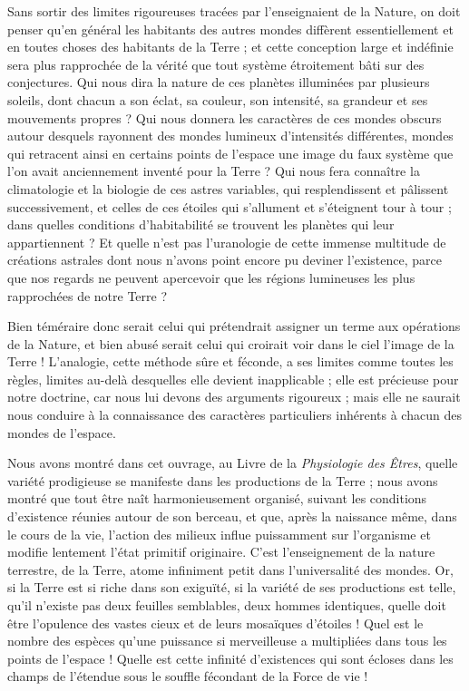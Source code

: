 \documentclass[a4paper, 11pt, oneside]{article}
\begin{document}
Sans sortir des limites rigoureuses tracées par l'enseignaient de la Nature, on doit penser qu'en général les habitants des autres mondes diffèrent essentiellement et en toutes choses des habitants de la Terre ; et cette conception large et indéfinie sera plus rapprochée de la vérité que tout système étroitement bâti sur des conjectures. Qui nous dira la nature de ces planètes illuminées par plusieurs soleils, dont chacun a son éclat, sa couleur, son intensité, sa grandeur et ses mouvements propres ? Qui nous donnera les caractères de ces mondes obscurs autour desquels rayonnent des mondes lumineux d'intensités différentes, mondes qui retracent ainsi en certains points de l'espace une image du faux système que l'on avait anciennement inventé pour la Terre ? Qui nous fera connaître la climatologie et la biologie de ces astres variables, qui resplendissent et pâlissent successivement, et celles de ces étoiles qui s'allument et s'éteignent tour à tour ; dans quelles conditions d'habitabilité se trouvent les planètes qui leur appartiennent ? Et quelle n'est pas l'uranologie de cette immense multitude de créations astrales dont nous n'avons point encore pu deviner l'existence, parce que nos regards ne peuvent apercevoir que les régions lumineuses les plus rapprochées de notre Terre ?

Bien téméraire donc serait celui qui prétendrait assigner un terme aux opérations de la Nature, et bien abusé serait celui qui croirait voir dans le ciel l'image de la Terre ! L'analogie, cette méthode sûre et féconde, a ses limites comme toutes les règles, limites au-delà desquelles elle devient inapplicable ; elle est précieuse pour notre doctrine, car nous lui devons des arguments rigoureux ; mais elle ne saurait nous conduire à la connaissance des caractères particuliers inhérents à chacun des mondes de l'espace.

Nous avons montré dans cet ouvrage, au Livre de la \emph{Physiologie des Êtres}, quelle variété prodigieuse se manifeste dans les productions de la Terre ; nous avons montré que tout être naît harmonieusement organisé, suivant les conditions d'existence réunies autour de son berceau, et que, après la naissance même, dans le cours de la vie, l'action des milieux influe puissamment sur l'organisme et modifie lentement l'état primitif originaire. C'est l'enseignement de la nature terrestre, de la Terre, atome infiniment petit dans l'universalité des mondes. Or, si la Terre est si riche dans son exiguïté, si la variété de ses productions est telle, qu'il n'existe pas deux feuilles semblables, deux hommes identiques, quelle doit être l'opulence des vastes cieux et de leurs mosaïques d'étoiles ! Quel est le nombre des espèces qu'une puissance si merveilleuse a multipliées dans tous les points de l'espace ! Quelle est cette infinité d'existences qui sont écloses dans les champs de l'étendue sous le souffle fécondant de la Force de vie !
\end{document}
